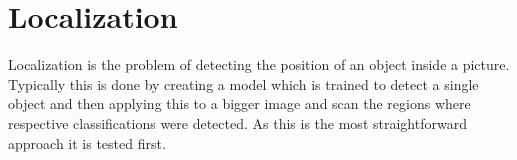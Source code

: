 \section{Localization}

Localization is the problem of detecting the position of an object inside a picture.
Typically this is done by creating a model which is trained to detect a single object and then applying this to a bigger image and scan the regions where respective classifications were detected.
As this is the most straightforward approach it is tested first.
